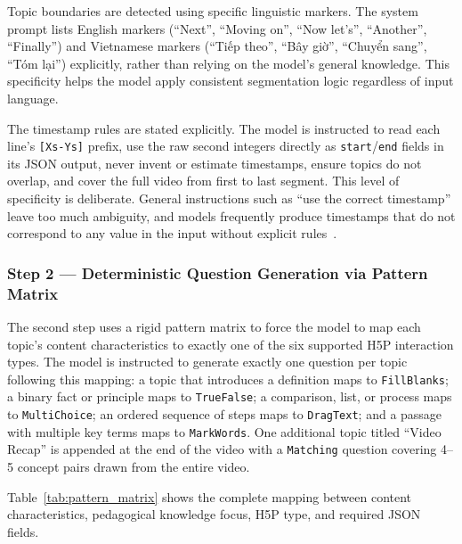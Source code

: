 Topic boundaries are detected using specific linguistic markers. The system prompt lists English markers (``Next'', ``Moving on'', ``Now let's'', ``Another'', ``Finally'') and Vietnamese markers (``Tiếp theo'', ``Bây giờ'', ``Chuyển sang'', ``Tóm lại'') explicitly, rather than relying on the model's general knowledge. This specificity helps the model apply consistent segmentation logic regardless of input language.

The timestamp rules are stated explicitly. The model is instructed to read each line's \texttt{[Xs-Ys]} prefix, use the raw second integers directly as \texttt{start}/\texttt{end} fields in its JSON output, never invent or estimate timestamps, ensure topics do not overlap, and cover the full video from first to last segment. This level of specificity is deliberate. General instructions such as ``use the correct timestamp'' leave too much ambiguity, and models frequently produce timestamps that do not correspond to any value in the input without explicit rules~\cite{white2023}.

\subsubsection{Step 2 --- Deterministic Question Generation via Pattern Matrix}

The second step uses a rigid pattern matrix to force the model to map each topic's content characteristics to exactly one of the six supported H5P interaction types. The model is instructed to generate exactly one question per topic following this mapping: a topic that introduces a definition maps to \texttt{FillBlanks}; a binary fact or principle maps to \texttt{TrueFalse}; a comparison, list, or process maps to \texttt{MultiChoice}; an ordered sequence of steps maps to \texttt{DragText}; and a passage with multiple key terms maps to \texttt{MarkWords}. One additional topic titled ``Video Recap'' is appended at the end of the video with a \texttt{Matching} question covering 4--5 concept pairs drawn from the entire video.

Table~\ref{tab:pattern_matrix} shows the complete mapping between content characteristics, pedagogical knowledge focus, H5P type, and required JSON fields.

